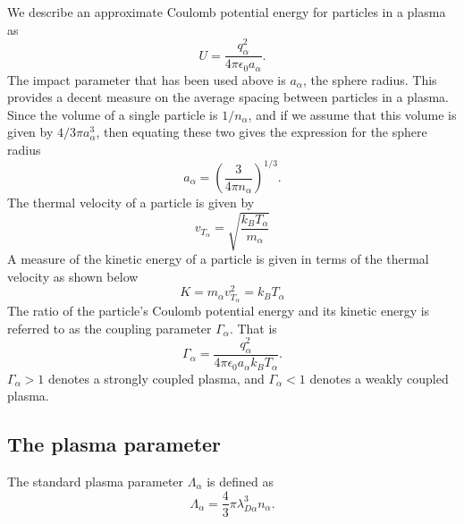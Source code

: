 \documentclass[a4paper,11pt]{report}
\begin{document}
We describe an approximate Coulomb potential energy for particles in a plasma as
\begin{equation}
    U =  \frac{q_\alpha^2}{4 \pi \epsilon_0 a_\alpha}.
\end{equation}
The impact parameter that has been used above is $a_\alpha$, the sphere radius. This provides a decent measure on the average spacing between particles in a plasma. Since the volume of a single particle is $1/n_\alpha$, and if we assume that this volume is given by $4/3 \pi a_\alpha^3$, then equating these two gives the expression for the sphere radius
\begin{equation}
    a_\alpha = \left ( \frac{3}{4 \pi n_\alpha} \right )^{1/3}.
\end{equation}
The thermal velocity of a particle is given by
\begin{equation}
    v_{T_\alpha} = \sqrt{\frac{k_B T_\alpha}{m_\alpha}}
\end{equation}
A measure of the kinetic energy of a particle is given in terms of the thermal velocity as shown below
\begin{equation}
    K = m_\alpha v_{T_\alpha}^2 = k_B T_\alpha
\end{equation}
The ratio of the particle's Coulomb potential energy and its kinetic energy is referred to as the coupling parameter $\Gamma_\alpha$. That is 
\begin{equation}
    \Gamma_\alpha = \frac{q_\alpha^2}{4 \pi \epsilon_0 a_\alpha k_B T_\alpha}.
\end{equation}
$\Gamma_\alpha > 1$ denotes a strongly coupled plasma, and $\Gamma_\alpha < 1$ denotes a weakly coupled plasma. 

\subsection{The plasma parameter}
The standard plasma parameter $\Lambda_\alpha$ is defined as
\begin{equation}
    \Lambda_\alpha = \frac{4}{3} \pi \lambda_{D\alpha}^3 n_\alpha.
\end{equation}
\end{document}
